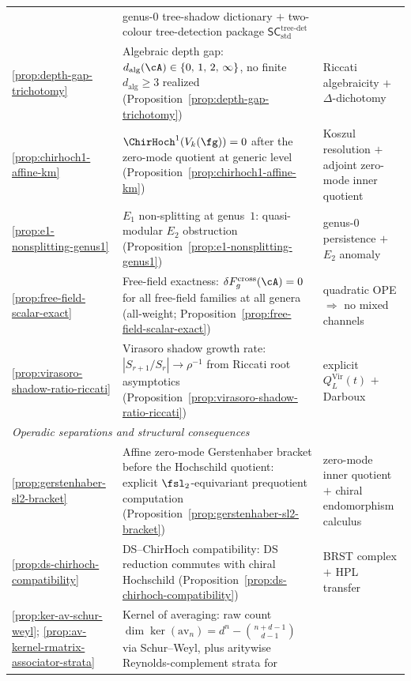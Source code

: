 \begin{center}
\begin{tabular}{lp{8cm}l}
 & genus-$0$ tree-shadow dictionary $+$
 two-colour tree-detection package
 $\mathsf{SC}^{\mathrm{tree}\text{-}\mathrm{det}}_{\mathrm{std}}$ \\
\ref{prop:depth-gap-trichotomy}
 & Algebraic depth gap:
 $d_{\mathrm{alg}}(\cA) \in \{0,\,1,\,2,\,\infty\}$,
 no finite $d_{\mathrm{alg}} \geq 3$ realized
 \textup{(}Proposition~\ref{prop:depth-gap-trichotomy}\textup{)}
 & Riccati algebraicity $+$ $\Delta$-dichotomy \\
\ref{prop:chirhoch1-affine-km}
 & $\ChirHoch^1(V_k(\fg)) = 0$ after the zero-mode quotient at generic level
 \textup{(}Proposition~\ref{prop:chirhoch1-affine-km}\textup{)}
 & Koszul resolution $+$ adjoint zero-mode inner quotient \\
\ref{prop:e1-nonsplitting-genus1}
 & $E_1$ non-splitting at genus~$1$:
 quasi-modular $E_2$ obstruction
 \textup{(}Proposition~\ref{prop:e1-nonsplitting-genus1}\textup{)}
 & genus-$0$ persistence $+$ $E_2$ anomaly \\
\ref{prop:free-field-scalar-exact}
 & Free-field exactness:
 $\delta F_g^{\mathrm{cross}}(\cA) = 0$ for all
 free-field families at all genera
 \textup{(}all-weight;
 Proposition~\ref{prop:free-field-scalar-exact}\textup{)}
 & quadratic OPE $\Rightarrow$ no mixed channels \\
\ref{prop:virasoro-shadow-ratio-riccati}
 & Virasoro shadow growth rate:
 $|S_{r+1}/S_r| \to \rho^{-1}$ from Riccati
 root asymptotics
 \textup{(}Proposition~\ref{prop:virasoro-shadow-ratio-riccati}\textup{)}
 & explicit $Q_L^{\mathrm{Vir}}(t)$ $+$ Darboux \\
\hline
\multicolumn{3}{l}{\textit{Operadic separations and structural consequences}} \\
\hline
\ref{prop:gerstenhaber-sl2-bracket}
 & Affine zero-mode Gerstenhaber bracket before the Hochschild quotient:
 explicit $\fsl_2$-equivariant prequotient computation
 \textup{(}Proposition~\ref{prop:gerstenhaber-sl2-bracket}\textup{)}
 & zero-mode inner quotient $+$ chiral endomorphism calculus \\
\ref{prop:ds-chirhoch-compatibility}
 & DS--ChirHoch compatibility:
 DS reduction commutes with chiral Hochschild
 \textup{(}Proposition~\ref{prop:ds-chirhoch-compatibility}\textup{)}
 & BRST complex $+$ HPL transfer \\
\ref{prop:ker-av-schur-weyl};
\ref{prop:av-kernel-rmatrix-associator-strata}
 & Kernel of averaging: raw count
 $\dim\ker(\mathrm{av}_n) = d^n - \binom{n+d-1}{d-1}$
 via Schur--Weyl, plus aritywise Reynolds-complement strata for

\end{tabular}
\end{center}

